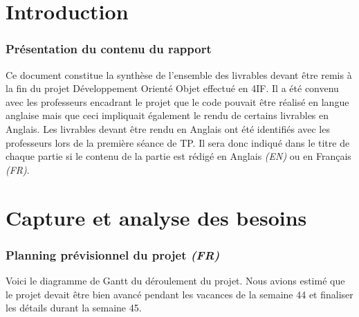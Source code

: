 \documentclass[paper=a4, fontsize=11pt]{report}
\numberwithin{equation}{section}		%
\numberwithin{figure}{section}		%
\numberwithin{table}{section}		%
\renewcommand{\it}[1]{\textit{#1}}
\begin{document}


\tableofcontents

\listoftodos

\newpage

\part{Introduction}
\label{part:introduction}

\section{Présentation du contenu du rapport}
\label{sec:presentation-du-contenu-du-rapport}

Ce document constitue la synthèse de l'ensemble des livrables devant être remis à la fin du projet Développement Orienté Objet effectué en 4IF. Il a été convenu avec les professeurs encadrant le projet que le code pouvait être réalisé en langue anglaise mais que ceci impliquait également le rendu de certains livrables en Anglais. Les livrables devant être rendu en Anglais ont été identifiés avec les professeurs lors de la première séance de TP. Il sera donc indiqué dans le titre de chaque partie si le contenu de la partie est rédigé en Anglais \it{(EN)} ou en Français \it{(FR)}.  


\part{Capture et analyse des besoins}
\label{part:capture-et-analyse-des-besoins}

\section{Planning prévisionnel du projet \it{(FR)}}
\label{sec:planning-previsionnel-du-projet}

Voici le diagramme de Gantt du déroulement du projet.
Nous avions estimé que le projet devait être bien avancé pendant les vacances de la semaine 44 et finaliser les détails durant la semaine 45.
\end{document}
